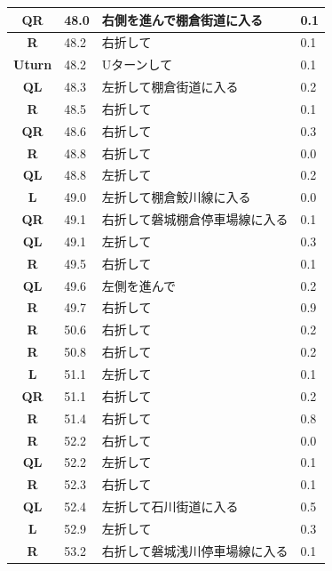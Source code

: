 \documentclass[11pt]{article}
\begin{document}
\begin{center}
\begin{supertabular}{|c|p{0.30in}|p{2.25in}|l|}
 \textbf{QR} &  48.0 & 右側を進んで棚倉街道に入る &   0.1 \\ \hline
{} \textbf{R} &  48.2 & 右折して &   0.1 \\ \hline
 \textbf{Uturn} &  48.2 & Uターンして &   0.1 \\ \hline
 \textbf{QL} &  48.3 & 左折して棚倉街道に入る &   0.2 \\ \hline
{} \textbf{R} &  48.5 & 右折して &   0.1 \\ \hline
{} \textbf{QR} &  48.6 & 右折して &   0.3 \\ \hline
{} \textbf{R} &  48.8 & 右折して &   0.0 \\ \hline
 \textbf{QL} &  48.8 & 左折して &   0.2 \\ \hline
 \textbf{L} &  49.0 & 左折して棚倉鮫川線に入る &   0.0 \\ \hline
{} \textbf{QR} &  49.1 & 右折して磐城棚倉停車場線に入る &   0.1 \\ \hline
 \textbf{QL} &  49.1 & 左折して &   0.3 \\ \hline
{} \textbf{R} &  49.5 & 右折して &   0.1 \\ \hline
 \textbf{QL} &  49.6 & 左側を進んで &   0.2 \\ \hline
{} \textbf{R} &  49.7 & 右折して &   0.9 \\ \hline
{} \textbf{R} &  50.6 & 右折して &   0.2 \\ \hline
{} \textbf{R} &  50.8 & 右折して &   0.2 \\ \hline
 \textbf{L} &  51.1 & 左折して &   0.1 \\ \hline
{} \textbf{QR} &  51.1 & 右折して &   0.2 \\ \hline
{} \textbf{R} &  51.4 & 右折して &   0.8 \\ \hline
{} \textbf{R} &  52.2 & 右折して &   0.0 \\ \hline
 \textbf{QL} &  52.2 & 左折して &   0.1 \\ \hline
{} \textbf{R} &  52.3 & 右折して &   0.1 \\ \hline
 \textbf{QL} &  52.4 & 左折して石川街道に入る &   0.5 \\ \hline
 \textbf{L} &  52.9 & 左折して &   0.3 \\ \hline
{} \textbf{R} &  53.2 & 右折して磐城浅川停車場線に入る &   0.1 \\ \hline

\end{supertabular}
\end{center}
\end{document}

